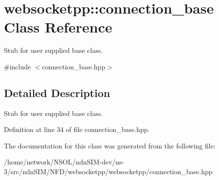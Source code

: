 \hypertarget{classwebsocketpp_1_1connection__base}{}\section{websocketpp\+:\+:connection\+\_\+base Class Reference}
\label{classwebsocketpp_1_1connection__base}


Stub for user supplied base class.  




{\ttfamily \#include $<$connection\+\_\+base.\+hpp$>$}



\subsection{Detailed Description}
Stub for user supplied base class. 

Definition at line 34 of file connection\+\_\+base.\+hpp.



The documentation for this class was generated from the following file\+:\begin{DoxyCompactItemize}
\item 
/home/network/\+N\+S\+O\+L/ndn\+S\+I\+M-\/dev/ns-\/3/src/ndn\+S\+I\+M/\+N\+F\+D/websocketpp/websocketpp/connection\+\_\+base.\+hpp\end{DoxyCompactItemize}

